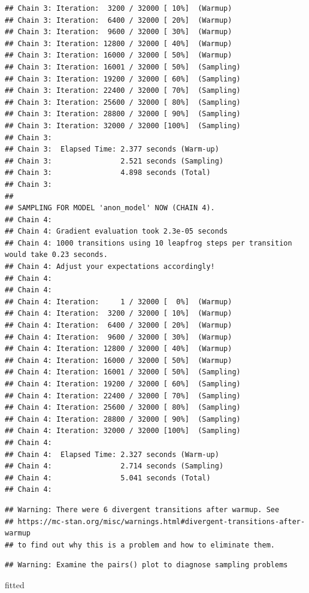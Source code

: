 \documentclass[
]{article}
\newenvironment{Shaded}{\begin{snugshade}}{\end{snugshade}}
\newcommand{\NormalTok}[1]{#1}
\begin{document}
\begin{verbatim}
## Chain 3: Iteration:  3200 / 32000 [ 10%]  (Warmup)
## Chain 3: Iteration:  6400 / 32000 [ 20%]  (Warmup)
## Chain 3: Iteration:  9600 / 32000 [ 30%]  (Warmup)
## Chain 3: Iteration: 12800 / 32000 [ 40%]  (Warmup)
## Chain 3: Iteration: 16000 / 32000 [ 50%]  (Warmup)
## Chain 3: Iteration: 16001 / 32000 [ 50%]  (Sampling)
## Chain 3: Iteration: 19200 / 32000 [ 60%]  (Sampling)
## Chain 3: Iteration: 22400 / 32000 [ 70%]  (Sampling)
## Chain 3: Iteration: 25600 / 32000 [ 80%]  (Sampling)
## Chain 3: Iteration: 28800 / 32000 [ 90%]  (Sampling)
## Chain 3: Iteration: 32000 / 32000 [100%]  (Sampling)
## Chain 3: 
## Chain 3:  Elapsed Time: 2.377 seconds (Warm-up)
## Chain 3:                2.521 seconds (Sampling)
## Chain 3:                4.898 seconds (Total)
## Chain 3: 
## 
## SAMPLING FOR MODEL 'anon_model' NOW (CHAIN 4).
## Chain 4: 
## Chain 4: Gradient evaluation took 2.3e-05 seconds
## Chain 4: 1000 transitions using 10 leapfrog steps per transition would take 0.23 seconds.
## Chain 4: Adjust your expectations accordingly!
## Chain 4: 
## Chain 4: 
## Chain 4: Iteration:     1 / 32000 [  0%]  (Warmup)
## Chain 4: Iteration:  3200 / 32000 [ 10%]  (Warmup)
## Chain 4: Iteration:  6400 / 32000 [ 20%]  (Warmup)
## Chain 4: Iteration:  9600 / 32000 [ 30%]  (Warmup)
## Chain 4: Iteration: 12800 / 32000 [ 40%]  (Warmup)
## Chain 4: Iteration: 16000 / 32000 [ 50%]  (Warmup)
## Chain 4: Iteration: 16001 / 32000 [ 50%]  (Sampling)
## Chain 4: Iteration: 19200 / 32000 [ 60%]  (Sampling)
## Chain 4: Iteration: 22400 / 32000 [ 70%]  (Sampling)
## Chain 4: Iteration: 25600 / 32000 [ 80%]  (Sampling)
## Chain 4: Iteration: 28800 / 32000 [ 90%]  (Sampling)
## Chain 4: Iteration: 32000 / 32000 [100%]  (Sampling)
## Chain 4: 
## Chain 4:  Elapsed Time: 2.327 seconds (Warm-up)
## Chain 4:                2.714 seconds (Sampling)
## Chain 4:                5.041 seconds (Total)
## Chain 4:
\end{verbatim}

\begin{verbatim}
## Warning: There were 6 divergent transitions after warmup. See
## https://mc-stan.org/misc/warnings.html#divergent-transitions-after-warmup
## to find out why this is a problem and how to eliminate them.
\end{verbatim}

\begin{verbatim}
## Warning: Examine the pairs() plot to diagnose sampling problems
\end{verbatim}

\begin{Shaded}
\begin{Highlighting}[]
\NormalTok{fitted}
\end{Highlighting}
\end{Shaded}
\end{document}
